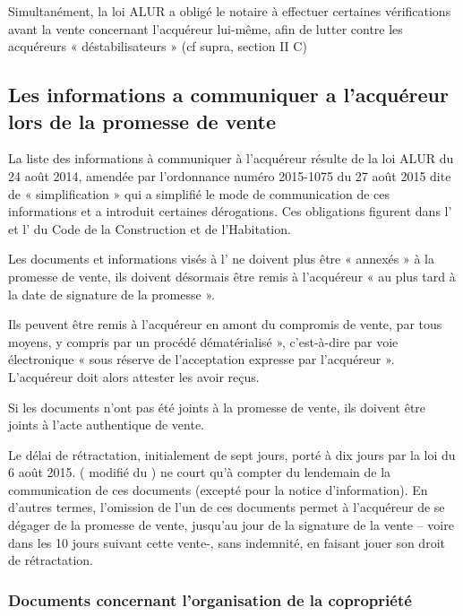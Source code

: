 	Simultanément, la loi ALUR a obligé le notaire à effectuer certaines vérifications avant la vente concernant
	l’acquéreur lui-même, afin de lutter contre les acquéreurs « déstabilisateurs » (cf supra, section II C)
	
	\subsection{Les informations a communiquer a l’acquéreur lors de la promesse de vente}
	
		La liste des informations à communiquer à l’acquéreur résulte de la loi ALUR du 24 août 2014, amendée
		par l’ordonnance numéro 2015-1075 du 27 août 2015 dite de « simplification » qui a simplifié le mode de
		communication de ces informations et a introduit certaines dérogations. Ces obligations figurent dans
		l’ et l’ du Code de la Construction et de l’Habitation.
		
		Les documents et informations visés à l’ ne doivent plus être « annexés » à la promesse de
		vente, ils doivent désormais être remis à l’acquéreur « au plus tard à la date de signature de la
		promesse ».
		
		Ils peuvent être remis à l'acquéreur en amont du compromis de vente, par tous moyens, y compris par un
		procédé dématérialisé », c’est-à-dire par voie électronique « sous réserve de l’acceptation expresse par
		l’acquéreur ». L’acquéreur doit alors attester les avoir reçus.
		
		Si les documents n’ont pas été joints à la promesse de vente, ils doivent être joints à l’acte authentique de
		vente.
		
		Le délai de rétractation, initialement de sept jours, porté à dix jours par la loi  du 6 août 2015.
		( modifié du \CCH) ne court qu’à compter du lendemain de la communication de ces
		documents (excepté pour la notice d’information). En d’autres termes, l’omission de l’un de ces
		documents permet à l’acquéreur de se dégager de la promesse de vente, jusqu’au jour de la signature de
		la vente – voire dans les 10 jours suivant cette vente-, sans indemnité, en faisant jouer son droit de
		rétractation.
		
		\subsubsection{Documents concernant l’organisation de la copropriété}
			
